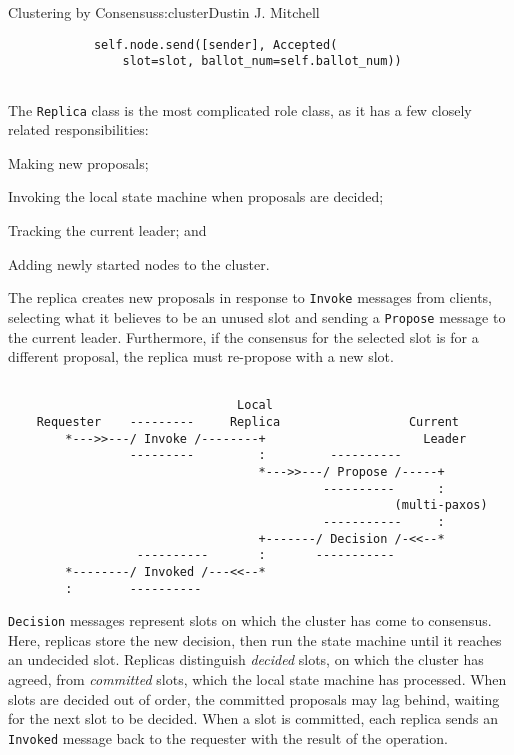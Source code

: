 \begin{aosachapter}{Clustering by Consensus}{s:cluster}{Dustin J. Mitchell}
\begin{verbatim}
            self.node.send([sender], Accepted(
                slot=slot, ballot_num=self.ballot_num))
    
\end{verbatim}

\label{replica}

The \texttt{Replica} class is the most complicated role class, as it has
a few closely related responsibilities:

\begin{aosaitemize}

\item
  Making new proposals;
\item
  Invoking the local state machine when proposals are decided;
\item
  Tracking the current leader; and
\item
  Adding newly started nodes to the cluster.
\end{aosaitemize}

The replica creates new proposals in response to \texttt{Invoke}
messages from clients, selecting what it believes to be an unused slot
and sending a \texttt{Propose} message to the current leader.
Furthermore, if the consensus for the selected slot is for a different
proposal, the replica must re-propose with a new slot.

\begin{verbatim}

                                Local
    Requester    ---------     Replica                  Current
        *--->>---/ Invoke /--------+                      Leader
                 ---------         :         ----------
                                   *--->>---/ Propose /-----+
                                            ----------      :
                                                      (multi-paxos)
                                            -----------     :
                                   +-------/ Decision /-<<--*
                  ----------       :       -----------
        *--------/ Invoked /---<<--*
        :        ----------
\end{verbatim}

\texttt{Decision} messages represent slots on which the cluster has come
to consensus. Here, replicas store the new decision, then run the state
machine until it reaches an undecided slot. Replicas distinguish
\emph{decided} slots, on which the cluster has agreed, from
\emph{committed} slots, which the local state machine has processed.
When slots are decided out of order, the committed proposals may lag
behind, waiting for the next slot to be decided. When a slot is
committed, each replica sends an \texttt{Invoked} message back to the
requester with the result of the operation.


\end{aosachapter}
